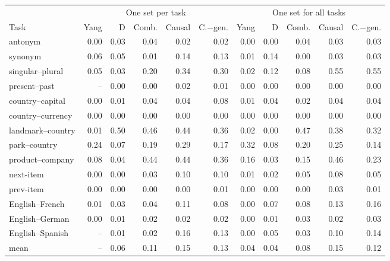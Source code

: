 \begin{tabular}{@{}lrrrrrrrrrr@{}}
\toprule
& \multicolumn{5}{c}{One set per task} & \multicolumn{5}{c}{One set for all tasks} \\
\cmidrule(lr){2-6} \cmidrule(lr){7-11}
Task & Yang & D & Comb. & Causal & C.$-$gen. & Yang & D & Comb. & Causal & C.$-$gen. \\
\midrule
antonym & 0.00 & 0.03 & 0.04 & 0.02 & 0.02 & 0.00 & 0.00 & 0.04 & 0.03 & 0.03 \\
synonym & 0.06 & 0.05 & 0.01 & 0.14 & 0.13 & 0.01 & 0.14 & 0.00 & 0.03 & 0.03 \\
singular--plural & 0.05 & 0.03 & 0.20 & 0.34 & 0.30 & 0.02 & 0.12 & 0.08 & 0.55 & 0.55 \\
present--past & -- & 0.00 & 0.00 & 0.02 & 0.01 & 0.00 & 0.00 & 0.00 & 0.00 & 0.00 \\
country--capital & 0.00 & 0.01 & 0.04 & 0.04 & 0.08 & 0.01 & 0.04 & 0.02 & 0.04 & 0.04 \\
country--currency & 0.00 & 0.00 & 0.00 & 0.00 & 0.00 & 0.00 & 0.00 & 0.00 & 0.00 & 0.00 \\
landmark--country & 0.01 & 0.50 & 0.46 & 0.44 & 0.36 & 0.02 & 0.00 & 0.47 & 0.38 & 0.32 \\
park--country & 0.24 & 0.07 & 0.19 & 0.29 & 0.17 & 0.32 & 0.08 & 0.20 & 0.25 & 0.14 \\
product--company & 0.08 & 0.04 & 0.44 & 0.44 & 0.36 & 0.16 & 0.03 & 0.15 & 0.46 & 0.23 \\
next-item & 0.00 & 0.00 & 0.03 & 0.10 & 0.10 & 0.01 & 0.02 & 0.05 & 0.08 & 0.05 \\
prev-item & 0.00 & 0.00 & 0.00 & 0.00 & 0.01 & 0.00 & 0.00 & 0.00 & 0.03 & 0.01 \\
English--French & 0.01 & 0.03 & 0.04 & 0.11 & 0.08 & 0.00 & 0.07 & 0.08 & 0.13 & 0.16 \\
English--German & 0.00 & 0.01 & 0.02 & 0.02 & 0.02 & 0.00 & 0.01 & 0.03 & 0.02 & 0.03 \\
English--Spanish & -- & 0.01 & 0.02 & 0.16 & 0.13 & 0.00 & 0.05 & 0.03 & 0.10 & 0.14 \\
\midrule
mean & -- & 0.06 & 0.11 & 0.15 & 0.13 & 0.04 & 0.04 & 0.08 & 0.15 & 0.12 \\
\bottomrule
\end{tabular}
